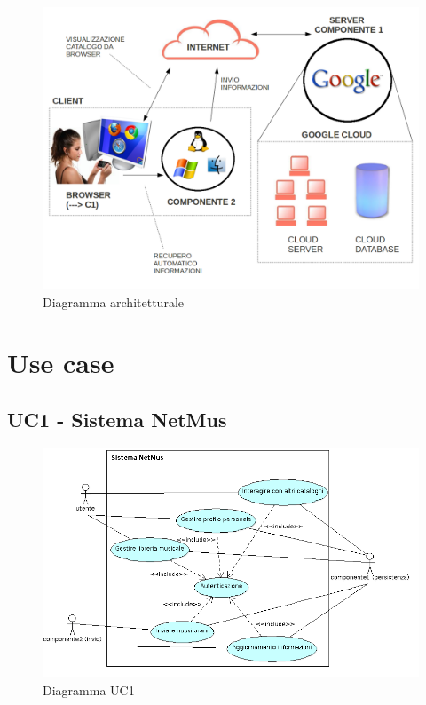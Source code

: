 \begin{figure}[h]
  \centering
  \includegraphics[width=16cm]{img/AR/DiagrammaArchitetturale.png}
\caption{Diagramma architetturale}
\end{figure}

\chapter{Use case}
\thispagestyle{fancy}

\section{UC1 - Sistema NetMus}

\begin{figure}[h]
  \centering
  \includegraphics[width=18cm]{img/AR/UC1.png}
\caption{Diagramma UC1}
\end{figure}

